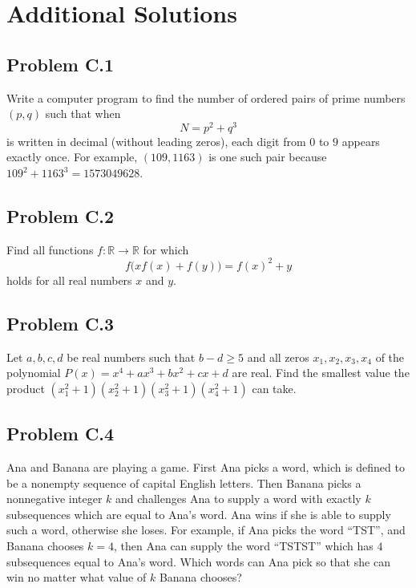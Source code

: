 \documentclass[12pt]{article}
\begin{document}
  \clearpage

  \section{\textsf{Additional Solutions}}
    \subsection{Problem C.1}
      \begin{tcolorbox}[problembox]
         Write a computer program to find the number of ordered pairs of prime numbers $(p,q)$ such that when
          \[
            N = p^2 + q^3
          \]
          is written in decimal (without leading zeros), each digit from $0$ to $9$ appears exactly once. For example, $(109,1163)$ is one
          such pair because $109^2 + 1163^3 = 1573049628$.
     \end{tcolorbox}

    \clearpage

    \subsection{Problem C.2}
      \begin{tcolorbox}[problembox]
         Find all functions $f:\mathbb{R}\to\mathbb{R}$ for which
          \[
            f\big(xf(x)+f(y)\big)=f(x)^2+y
          \]
          holds for all real numbers $x$ and $y$.
      \end{tcolorbox}

    \clearpage

    \subsection{Problem C.3}
      \begin{tcolorbox}[problembox]
         Let $a,b,c,d$ be real numbers such that $b-d\ge 5$ and all zeros $x_1,x_2,x_3,x_4$ of the polynomial $P(x)=x^4+ax^3+bx^2+cx+d$ are 
          real. Find the smallest value the product $(x_1^2+1)(x_2^2+1)(x_3^2+1)(x_4^2+1)$ can take.
      \end{tcolorbox}
          
    \clearpage

    \subsection{Problem C.4}
      \begin{tcolorbox}[problembox]
         Ana and Banana are playing a game. First Ana picks a word, which is defined to be a nonempty sequence of capital English
          letters. Then Banana picks a nonnegative integer $k$ and challenges Ana to supply a word with exactly $k$ subsequences which are 
          equal to Ana's word. Ana wins if she is able to supply such a word, otherwise she loses. For example, if Ana picks the word “TST”,
          and Banana chooses $k=4$, then Ana can supply the word “TSTST” which has $4$ subsequences equal to Ana's word. Which words can Ana 
          pick so that she can win no matter what value of $k$ Banana chooses?
      \end{tcolorbox}
\end{document}
